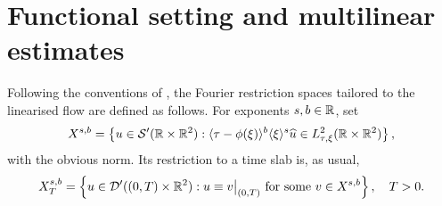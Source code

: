 %

\section{Functional setting and multilinear estimates}\label{sec:multi}

Following the conventions of \cite{bourg1, bourg2, tao_book}, the Fourier restriction spaces tailored to the linearised flow are defined as follows. For exponents $s,b\in\mathbb{R}$, set
\begin{equation}
X^{s,b}=\left\{ u\in \mathcal{S}'(\mathbb{R}\times \mathbb{R}^2) : \langle \tau-\phi(\xi) \rangle^b\langle \xi \rangle^s  \widehat{u}\in L^2_{\tau,\xi}(\mathbb{R}\times \mathbb{R}^2)\right\},
\end{equation}
with the obvious norm. Its restriction to a time slab is, as usual,
\begin{equation}
X^{s,b}_T=\left\{ u\in \mathcal{D}'((0,T)\times \mathbb{R}^2) : u\equiv v\big|_{(0,T)}\mbox{ for some }v\in X^{s,b}  \right\},\quad T>0.
\end{equation}

\medskip

